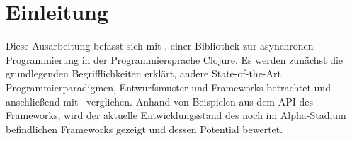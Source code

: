 \chapter{Einleitung}
Diese Ausarbeitung befasst sich mit \CA , einer Bibliothek zur asynchronen Programmierung in der Programmiersprache Clojure. Es werden zunächst die grundlegenden Begrifflichkeiten erklärt, andere State-of-the-Art Programmierparadigmen, Entwurfsmuster und Frameworks betrachtet und anschließend mit \CA\ verglichen. Anhand von Beispielen aus dem \acf{API} des Frameworks, wird der aktuelle Entwicklungsstand des noch im Alpha-Stadium befindlichen Frameworks gezeigt und dessen Potential bewertet.
\acresetall